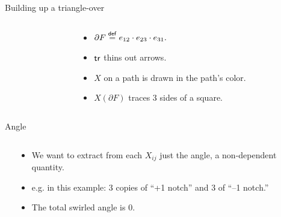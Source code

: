 \documentclass[14pt,aspectratio=169]{beamer}
\begin{document}
\begin{frame}{Building up a triangle-over}
\end{frame}

\begin{frame}
\begin{columns}
\begin{column}{0.65\textwidth}
\vspace{12pt}
\begingroup
{}

\endgroup
\end{column}
\begin{column}{0.35\textwidth}
\begin{itemize}
\item \( \partial F\stackrel{\mathsf{def}}{=} e_{12}\cdot e_{23}\cdot e_{31}.  \)
\item \( \mathsf{tr} \) thins out arrows.
\item \( X \) on a path is drawn in the path's color.
\item \( X(\partial F) \) traces 3 sides of a square.
\end{itemize}
\end{column}
\end{columns}
\end{frame}

\begin{frame}{Angle}
\begin{columns}
\begin{column}{0.3\textwidth}

\end{column}
\begin{column}{0.7\textwidth}
\begin{itemize}
\item We want to extract from each \( X_{ij} \) just the \alert{angle}, a non-dependent quantity.
\item e.g. in this example: 3 copies of ``+1 notch'' and 3 of ``--1 notch.''
\item The total swirled angle is 0.
\end{itemize}
\end{column}
\end{columns}
\end{frame}
\end{document}
